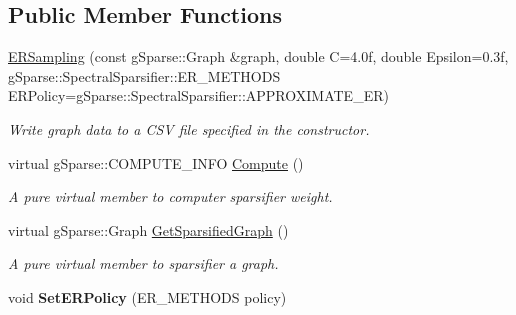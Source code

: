 \subsection*{Public Member Functions}
\begin{DoxyCompactItemize}
\item 
\mbox{\hyperlink{classg_sparse_1_1_spectral_sparsifier_1_1_e_r_sampling_a1ceb48c424600cbe6d315f3f5bad1598}{E\+R\+Sampling}} (const g\+Sparse\+::\+Graph \&graph, double C=4.\+0f, double Epsilon=0.\+3f, g\+Sparse\+::\+Spectral\+Sparsifier\+::\+E\+R\+\_\+\+M\+E\+T\+H\+O\+D\+S E\+R\+Policy=g\+Sparse\+::\+Spectral\+Sparsifier\+::\+A\+P\+P\+R\+O\+X\+I\+M\+A\+T\+E\+\_\+\+E\+R)
\begin{DoxyCompactList}\small\item\em Write graph data to a C\+SV file specified in the constructor. \end{DoxyCompactList}\item 
\mbox{\label{classg_sparse_1_1_spectral_sparsifier_1_1_e_r_sampling_a4751e449a9c2fa43b57db6eb703a622d}} 
virtual g\+Sparse\+::\+C\+O\+M\+P\+U\+T\+E\+\_\+\+I\+N\+FO \mbox{\hyperlink{classg_sparse_1_1_spectral_sparsifier_1_1_e_r_sampling_a4751e449a9c2fa43b57db6eb703a622d}{Compute}} ()
\begin{DoxyCompactList}\small\item\em A pure virtual member to computer sparsifier weight. \end{DoxyCompactList}\item 
\mbox{\label{classg_sparse_1_1_spectral_sparsifier_1_1_e_r_sampling_a5322f1076777028699d010daa5cd2406}} 
virtual g\+Sparse\+::\+Graph \mbox{\hyperlink{classg_sparse_1_1_spectral_sparsifier_1_1_e_r_sampling_a5322f1076777028699d010daa5cd2406}{Get\+Sparsified\+Graph}} ()
\begin{DoxyCompactList}\small\item\em A pure virtual member to sparsifier a graph. \end{DoxyCompactList}\item 
\mbox{\label{classg_sparse_1_1_spectral_sparsifier_1_1_e_r_sampling_a35cf40021c7fa90b5dda042896691bff}} 
void {\bfseries Set\+E\+R\+Policy} (E\+R\+\_\+\+M\+E\+T\+H\+O\+DS policy)
\item 

\end{DoxyCompactItemize}
